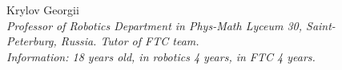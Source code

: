 \begin{figure}[H]
	\begin{minipage}{0.47\linewidth}
		Krylov Georgii \\ 
		\emph{Professor of Robotics Department in Phys-Math Lyceum 30, Saint-Peterburg, Russia. Tutor of FTC team. \\}
		\emph{Information: 18 years old, in robotics 4 years, in FTC 4 years.}
	\end{minipage}	
	\hfill
	\begin{minipage}[h]{0.47\linewidth}
		\\
	\end{minipage}
	\vfill 
\end{figure}

\fillpage

